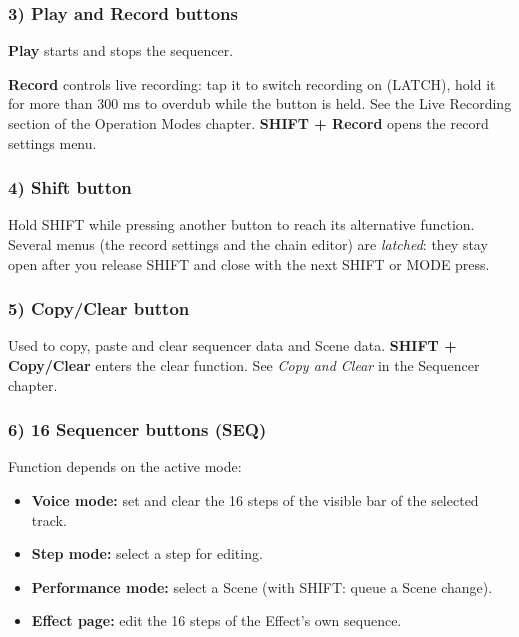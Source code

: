 \subsubsection{3) Play and Record
buttons}\label{play-and-record-buttons}

\textbf{Play} starts and stops the sequencer.

\textbf{Record} controls live recording: tap it to switch recording on
(LATCH), hold it for more than 300 ms to overdub while the button is
held. See the Live Recording section of the Operation Modes chapter.
\textbf{SHIFT + Record} opens the record settings menu.

\subsubsection{4) Shift button}\label{shift-button}

Hold SHIFT while pressing another button to reach its alternative
function. Several menus (the record settings and the chain editor) are
\emph{latched}: they stay open after you release SHIFT and close with
the next SHIFT or MODE press.


\subsubsection{5) Copy/Clear button}\label{copyclear-button}

Used to copy, paste and clear sequencer data and Scene data.
\textbf{SHIFT + Copy/Clear} enters the clear function. See \emph{Copy
and Clear} in the Sequencer chapter.

\subsubsection{6) 16 Sequencer buttons
(SEQ)}\label{sequencer-buttons-seq}

Function depends on the active mode:

\begin{itemize}
\tightlist
\item
  \textbf{Voice mode:} set and clear the 16 steps of the visible bar of
  the selected track.
\item
  \textbf{Step mode:} select a step for editing.
\item
  \textbf{Performance mode:} select a Scene (with SHIFT: queue a Scene
  change).
\item
  \textbf{Effect page:} edit the 16 steps of the Effect's own sequence.
\end{itemize}

